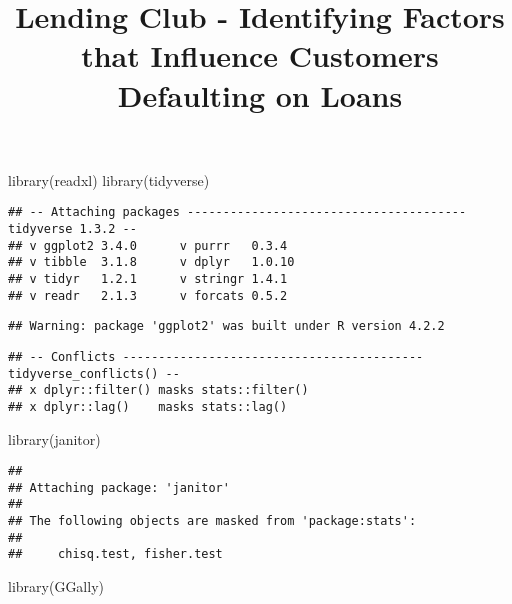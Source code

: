 \documentclass[
]{article}
\title{Lending Club - Identifying Factors that Influence Customers
Defaulting on Loans}
\author{}
\date{\vspace{-2.5em}}
\newenvironment{Shaded}{\begin{snugshade}}{\end{snugshade}}
\newcommand{\FunctionTok}[1]{\textcolor[rgb]{0.00,0.00,0.00}{#1}}
\newcommand{\NormalTok}[1]{#1}
\newcommand{\StringTok}[1]{\textcolor[rgb]{0.31,0.60,0.02}{#1}}
\begin{document}
\maketitle

\begin{Shaded}
\begin{Highlighting}[]
\FunctionTok{library}\NormalTok{(}\StringTok{\textquotesingle{}readxl\textquotesingle{}}\NormalTok{)}
\FunctionTok{library}\NormalTok{(}\StringTok{\textquotesingle{}tidyverse\textquotesingle{}}\NormalTok{)}
\end{Highlighting}
\end{Shaded}

\begin{verbatim}
## -- Attaching packages --------------------------------------- tidyverse 1.3.2 --
## v ggplot2 3.4.0      v purrr   0.3.4 
## v tibble  3.1.8      v dplyr   1.0.10
## v tidyr   1.2.1      v stringr 1.4.1 
## v readr   2.1.3      v forcats 0.5.2
\end{verbatim}

\begin{verbatim}
## Warning: package 'ggplot2' was built under R version 4.2.2
\end{verbatim}

\begin{verbatim}
## -- Conflicts ------------------------------------------ tidyverse_conflicts() --
## x dplyr::filter() masks stats::filter()
## x dplyr::lag()    masks stats::lag()
\end{verbatim}

\begin{Shaded}
\begin{Highlighting}[]
\FunctionTok{library}\NormalTok{(}\StringTok{\textquotesingle{}janitor\textquotesingle{}}\NormalTok{)}
\end{Highlighting}
\end{Shaded}

\begin{verbatim}
## 
## Attaching package: 'janitor'
## 
## The following objects are masked from 'package:stats':
## 
##     chisq.test, fisher.test
\end{verbatim}

\begin{Shaded}
\begin{Highlighting}[]
\FunctionTok{library}\NormalTok{(}\StringTok{\textquotesingle{}GGally\textquotesingle{}}\NormalTok{)}
\end{Highlighting}
\end{Shaded}
\end{document}
